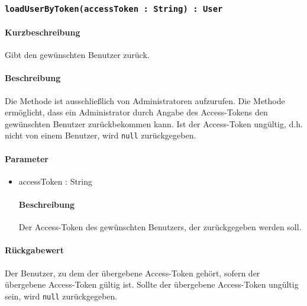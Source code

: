 \subsubsection{\texttt{loadUserByToken(accessToken : String) : User}}%
\paragraph*{Kurzbeschreibung}
Gibt den gewünschten Benutzer zurück.
\paragraph*{Beschreibung}
Die Methode ist ausschließlich von Administratoren aufzurufen.
Die Methode ermöglicht, dass ein Administrator durch Angabe des Access-Tokens den gewünschten Benutzer zurückbekommen kann. 
Ist der Access-Token ungültig, d.h. nicht von einem Benutzer, wird \texttt{null} zurückgegeben.
\paragraph*{Parameter}
\begin{itemize}
    \item accessToken : String
    		\paragraph*{Beschreibung}
    		Der Access-Token des gewünschten Benutzers, der zurückgegeben werden soll.
\end{itemize}
\paragraph*{Rückgabewert}
Der Benutzer, zu dem der übergebene Access-Token gehört, sofern der übergebene Access-Token gültig ist.
Sollte der übergebene Access-Token ungültig sein, wird \texttt{null} zurückgegeben.
